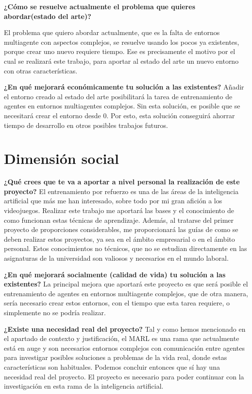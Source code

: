 \textbf{¿Cómo se resuelve actualmente el problema que quieres abordar(estado del arte)?}

El problema que quiero abordar actualmente, que es la falta de entornos multiagente con aspectos complejos, se resuelve usando los pocos ya existentes, porque crear uno nuevo requiere tiempo. Ese es precisamente el motivo por el cual se realizará este trabajo, para aportar al estado del arte un nuevo entorno con otras características.  

\textbf{¿En qué mejorará económicamente tu solución a las existentes?}
Añadir el entorno creado al estado del arte posibilitará la tarea de entrenamiento de agentes en entornos multiagentes complejos. Sin esta solución, es posible que se necesitará crear el entorno desde 0. Por esto, esta solución conseguirá ahorrar tiempo de desarrollo en otros posibles trabajos futuros. 

\section{Dimensión social}

\textbf{¿Qué crees que te va a aportar a nivel personal la realización de este proyecto?}
El entrenamiento por refuerzo es una de las áreas de la inteligencia artificial que más me han interesado, sobre todo por mi gran afición a los videojuegos. Realizar este trabajo me aportará las bases y el conocimiento de como funcionan estas técnicas de aprendizaje. Además, al tratarse del primer proyecto de proporciones considerables, me proporcionará las guías de como se deben realizar estos proyectos, ya sea en el ámbito empresarial o en el ámbito personal. Estos conocimientos no técnicos, que no se estudian directamente en las asignaturas de la universidad son valiosos y necesarios en el mundo laboral.  

\textbf{¿En qué mejorará socialmente (calidad de vida) tu solución a las existentes?}
La principal mejora que aportará este proyecto es que será posible el entrenamiento de agentes en entornos multiagente complejos, que de otra manera, sería necesario crear estos entornos, con el tiempo que esta tarea requiere, o simplemente no se podría realizar.  

\textbf{¿Existe una necesidad real del proyecto?}
Tal y como hemos mencionado en el apartado de contexto y justificación, el MARL es una rama que actualmente está en auge y son necesarios entornos complejos con comunicación entre agentes para investigar posibles soluciones a problemas de la vida real, donde estas características son habituales. Podemos concluir entonces que sí hay una necesidad real del proyecto. El proyecto es necesario para poder continuar con la investigación en esta rama de la inteligencia artificial.


